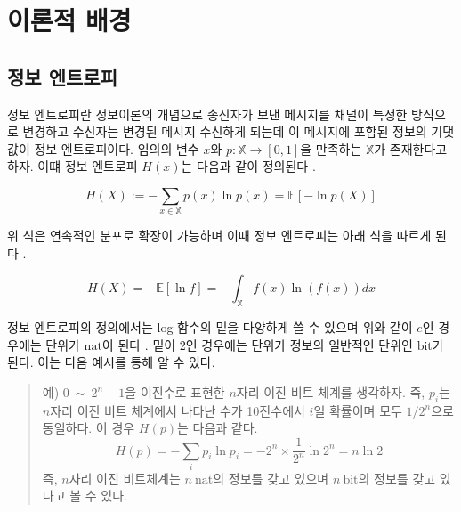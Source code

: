 \section{이론적 배경}

\subsection{정보 엔트로피}

정보 엔트로피란 정보이론의 개념으로 송신자가 보낸 메시지를 채널이 특정한 방식으로 변경하고 수신자는 변경된 메시지 수신하게 되는데 이 메시지에 포함된 정보의 기댓값이 정보 엔트로피이다. 임의의 변수 $x$와 $p:\mathbb{X} \rightarrow[0,1]$을 만족하는 $\mathbb{X}$가 존재한다고 하자. 이떄 정보 엔트로피 $H(x)$는 다음과 같이 정의된다 \cite{Wikipedia_Entropy}.

\begin{equation}
    H(X):=-\sum_{x \in \mathbb{X}} p(x) \ln{p(x)} = \mathbb{E}[-\ln{p(X)}]
    \label{H definition}
\end{equation}


위 식은 연속적인 분포로 확장이 가능하며 이때 정보 엔트로피는 아래 식을 따르게 된다 \cite{Wikipedia_Differential_Entropy}.

\begin{equation}
    H(X) = -\mathbb{E}[\ln{f}] = -\int_{\mathbb{X}} f(x) \ln{(f(x))}dx
    \label{H definition - continuous}
\end{equation}

정보 엔트로피의 정의에서는 log 함수의 밑을 다양하게 쓸 수 있으며 위와 같이 $e$인 경우에는 단위가 $\mathrm{nat}$이 된다 \cite{Wikipedia_Nats}. 밑이 2인 경우에는 단위가 정보의 일반적인 단위인 $\mathrm{bit}$가 된다. 이는 다음 예시를 통해 알 수 있다.

\begin{quote}
    예) $0 ~\sim~ 2^{n}-1$을 이진수로 표현한 $n$자리 이진 비트 체계를 생각하자. 즉, $p_{i}$는 $n$자리 이진 비트 체계에서 나타난 수가 10진수에서 $i$일 확률이며 모두 $1/2^{n}$으로 동일하다. 이 경우 $H(p)$는 다음과 같다.
    \begin{equation*}
        H(p) = - \sum_{i} p_{i} \ln{p_{i}} = - 2^{n} \times \frac{1}{2^{n}} \ln{2^{n}} = n \ln{2}
    \end{equation*}
    즉, $n$자리 이진 비트체계는 $n\mathrm{~nat}$의 정보를 갖고 있으며 $n\mathrm{~bit}$의 정보를 갖고 있다고 볼 수 있다.
\end{quote}


